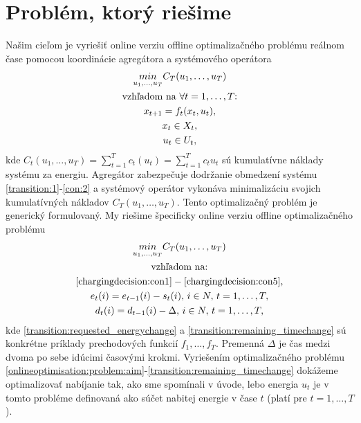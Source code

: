 \section{Problém, ktorý riešime}
\label{problemthatwearesolving}
Našim cieľom je vyriešiť online verziu offline optimalizačného
problému reálnom čase pomocou koordinácie agregátora a systémového operátora
\begin{gather}
    \label{offlineoptimisation:problem1}
    \underset{u_{1}, \dots, u_{T}}{min} C_{T} (u_{1}, \dots, u_{T}) \\
    \notag
    \text{vzhľadom na $\forall t = 1, \dots, T$:} \\
    x_{t + 1} = f_{t}(x_{t}, u_{t}) \label{transition:1}, \\
    x_{t} \in X_{t} \label{con:1}, \\
    u_{t} \in U_{t} \label{con:2},
\end{gather}
kde $C_{t}(u_{1}, \dots, u_{T}) = \sum_{t=1}^{T} c_{t}( u_{t}) = \sum_{t=1}^{T} c_{t} u_{t}$ sú kumulatívne náklady systému za energiu. Agregátor zabezpečuje dodržanie obmedzení systému \eqref{transition:1}-\eqref{con:2} a systémový operátor vykonáva minimalizáciu svojich kumulatívných nákladov $C_{T}(u_{1},\dots,u_{T})$. Tento optimalizačný problém je generický formulovaný. My riešime špecificky online verziu offline optimalizačného problému  
\begin{gather}
    \label{onlineoptimisation:problem:aim}
    \underset{u_{1}, \dots, u_{T}}{min} C_{T} (u_{1}, \dots, u_{T}) \\
    \notag
    \text{vzhľadom na:} \\
    \eqref{chargingdecision:con1}-\eqref{chargingdecision:con5}, \\
    \label{transition:requested_energychange}
    e_{t}(i) = e_{t-1}(i) - s_{t}(i), \, i \in N, \, t = 1,\dots, T, \\
    \label{transition:remaining_timechange}
    d_{t}(i) = d_{t-1}(i) - \Delta, \, i \in N, \, t = 1,\dots, T,
\end{gather}
kde \eqref{transition:requested_energychange} a \eqref{transition:remaining_timechange} sú konkrétne príklady prechodových funkcií $f_{1},\dots,f_{T}$. Premenná $\Delta$ je čas medzi dvoma po sebe idúcimi časovými krokmi. Vyriešením optimalizačného problému \eqref{onlineoptimisation:problem:aim}-\eqref{transition:remaining_timechange} dokážeme optimalizovať nabíjanie tak, ako sme spomínali v úvode, lebo energia $u_{t}$ je v tomto probléme definovaná ako súčet nabitej energie v čase $t$ (platí pre  $t = 1, \dots, T$). 

